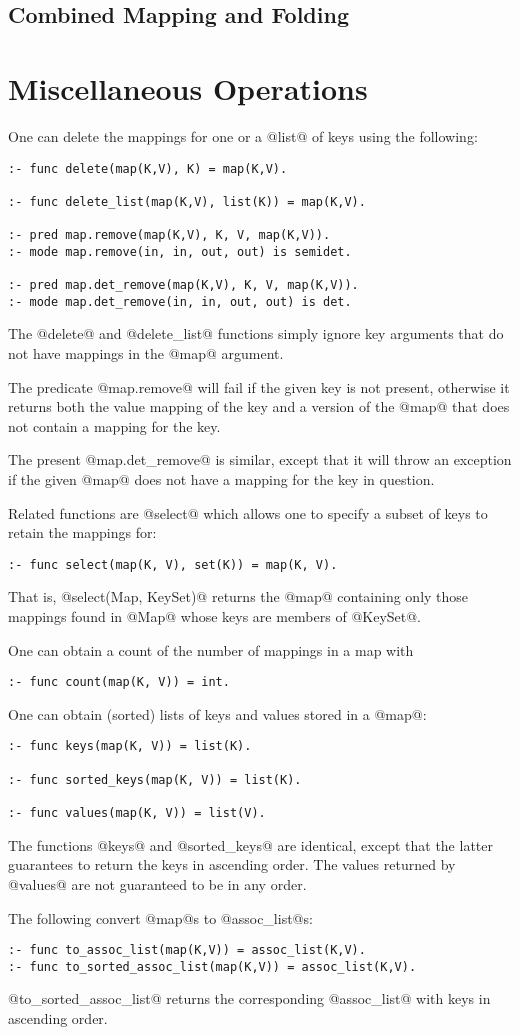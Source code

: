 \subsection{Combined Mapping and Folding}


\section{Miscellaneous Operations}


One can delete the mappings for one or a @list@ of keys using the
following:
\begin{verbatim}
:- func delete(map(K,V), K) = map(K,V).

:- func delete_list(map(K,V), list(K)) = map(K,V).

:- pred map.remove(map(K,V), K, V, map(K,V)).
:- mode map.remove(in, in, out, out) is semidet.

:- pred map.det_remove(map(K,V), K, V, map(K,V)).
:- mode map.det_remove(in, in, out, out) is det.
\end{verbatim}
The @delete@ and @delete_list@ functions simply ignore key arguments
that do not have mappings in the @map@ argument.

The predicate @map.remove@ will fail if the given key is not present,
otherwise it returns both the value mapping of the key and a version of
the @map@ that does not contain a mapping for the key.

The present @map.det_remove@ is similar, except that it will throw an
exception if the given @map@ does not have a mapping for the key in
question.

Related functions are @select@ which allows one to specify a subset of
keys to retain the mappings for:
\begin{verbatim}
:- func select(map(K, V), set(K)) = map(K, V).
\end{verbatim}
That is, @select(Map, KeySet)@ returns the @map@ containing
only those mappings found in @Map@ whose keys are members of @KeySet@.

One can obtain a count of the number of mappings in a map with
\begin{verbatim}
:- func count(map(K, V)) = int.
\end{verbatim}

One can obtain (sorted) lists of keys and values stored in a @map@:
\begin{verbatim}
:- func keys(map(K, V)) = list(K).

:- func sorted_keys(map(K, V)) = list(K).

:- func values(map(K, V)) = list(V).
\end{verbatim}
The functions @keys@ and @sorted_keys@ are identical, except that the
latter guarantees to return the keys in ascending order.  The values
returned by @values@ are not guaranteed to be in any order.

The following convert @map@s to @assoc_list@s:
\begin{verbatim}
:- func to_assoc_list(map(K,V)) = assoc_list(K,V).
:- func to_sorted_assoc_list(map(K,V)) = assoc_list(K,V).
\end{verbatim}
@to_sorted_assoc_list@ returns the corresponding @assoc_list@ with keys
in ascending order.

